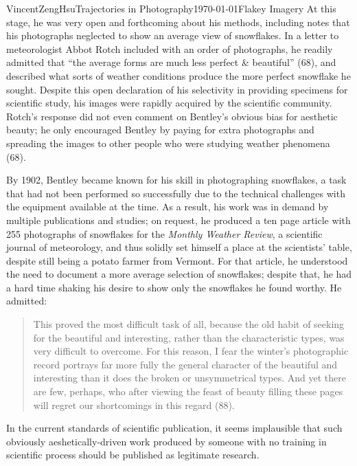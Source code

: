 \documentclass{article}[12pt]
\begin{document}
\begin{mla}{Vincent}{Zeng}{Hsu}{Trajectories in Photography}{\today}{Flakey Imagery}
At this stage, he was very open and forthcoming about his methods, including notes that his photographs neglected to show an average view of snowflakes. In a letter to meteorologist Abbot Rotch included with an order of photographs, he readily admitted that ``the average forms are much less perfect \& beautiful'' (68), and described what sorts of weather conditions produce the more perfect snowflake he sought. Despite this open declaration of his selectivity in providing specimens for scientific study, his images were rapidly acquired by the scientific community. Rotch's response did not even comment on Bentley's obvious bias for aesthetic beauty; he only encouraged Bentley by paying for extra photographs and spreading the images to other people who were studying weather phenomena (68).

By 1902, Bentley became known for his skill in photographing snowflakes, a task that had not been performed so successfully due to the technical challenges with the equipment available at the time. As a result, his work was in demand by multiple publications and studies; on request, he produced a ten page article with 255 photographs of snowflakes for the \textit{Monthly Weather Review}, a scientific journal of meteorology, and thus solidly set himself a place at the scientists' table, despite still being a potato farmer from Vermont. For that article, he understood the need to document a more average selection of snowflakes; despite that, he had a hard time shaking his desire to show only the snowflakes he found worthy. He admitted: \begin{quote}	This proved the most difficult task of all, because the old habit of seeking for the beautiful and interesting, rather than the characteristic types, was very difficult to overcome. For this reason, I fear the winter's photographic record portrays far more fully the general character of the beautiful and interesting than it does the broken or unsymmetrical types. And yet there are few, perhaps, who after viewing the feast of beauty filling these pages will regret our shortcomings in this regard (88).\end{quote} In the current standards of scientific publication, it seems implausible that such obviously aeshetically-driven work produced by someone with no training in scientific process should be published as legitimate research.


\end{mla}
\end{document}
